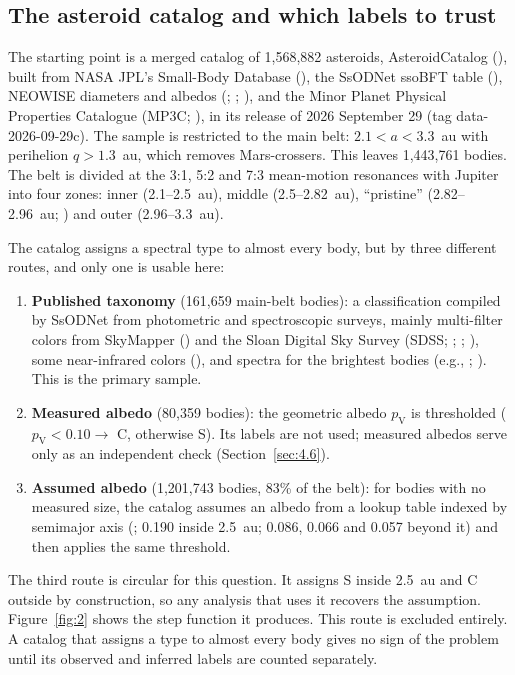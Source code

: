 \documentclass[twocolumn]{aastex701}
\begin{document}
\subsection{The asteroid catalog and which labels to trust}\label{sec:3.1}
The starting point is a merged catalog of 1,568,882 asteroids, AsteroidCatalog (\citealt{edwards2026b}), built from NASA JPL’s Small-Body Database (), the SsODNet ssoBFT table (\citealt{berthier2023}), NEOWISE diameters and albedos (\citealt{mainzer2011a,mainzer2019}; \citealt{masiero2011,masiero2012,masiero2014,masiero2017}; \citealt{nugent2015,nugent2016}), and the Minor Planet Physical Properties Catalogue (MP3C; ), in its release of 2026 September 29 (tag \mbox{data-2026-09-29c}). The sample is restricted to the main belt: $2.1 < a < 3.3$~au with perihelion $q > 1.3$~au, which removes Mars-crossers. This leaves 1,443,761 bodies. The belt is divided at the 3:1, 5:2 and 7:3 mean-motion resonances with Jupiter into four zones: inner (2.1–2.5~au), middle (2.5–2.82~au), “pristine” (2.82–2.96~au; \citealt{brozetal2013}) and outer (2.96–3.3~au).

The catalog assigns a spectral type to almost every body, but by three different routes, and only one is usable here:

\begin{enumerate}
\item \textbf{Published taxonomy} (161,659 main-belt bodies): a classification compiled by SsODNet from photometric and spectroscopic surveys, mainly multi-filter colors from SkyMapper (\citealt{sergeyev2022}) and the Sloan Digital Sky Survey (SDSS; \citealt{carvano2010}; \citealt{demeo2013}; \citealt{sergeyev2021}), some near-infrared colors (\citealt{popescu2018}), and spectra for the brightest bodies (e.g., \citealt{bus2002}; \citealt{mahlke2022}). This is the primary sample.
\item \textbf{Measured albedo} (80,359 bodies): the geometric albedo $p_{\mathrm{V}}$ is thresholded ($p_{\mathrm{V}} < 0.10 \rightarrow$ C, otherwise S). Its labels are not used; measured albedos serve only as an independent check (Section~\ref{sec:4.6}).
\item \textbf{Assumed albedo} (1,201,743 bodies, 83\% of the belt): for bodies with no measured size, the catalog assumes an albedo from a lookup table indexed by semimajor axis (\citealt{edwards2026b}; 0.190 inside 2.5~au; 0.086, 0.066 and 0.057 beyond it) and then applies the same threshold.
\end{enumerate}
The third route is circular for this question. It assigns S inside 2.5~au and C outside by construction, so any analysis that uses it recovers the assumption. Figure~\ref{fig:2} shows the step function it produces. This route is excluded entirely. A catalog that assigns a type to almost every body gives no sign of the problem until its observed and inferred labels are counted separately.
\end{document}
